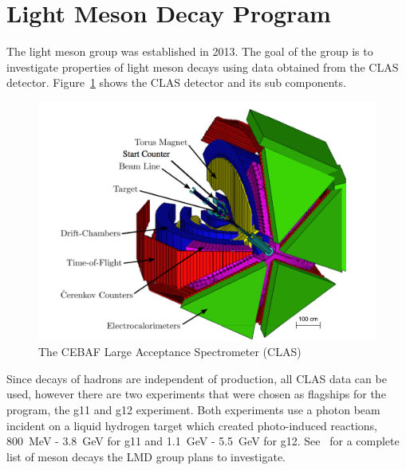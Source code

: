 \documentclass{aip-cp}
\begin{document}
\section{Light Meson Decay Program}
The light meson group was established in 2013. The goal of the group is to investigate properties of light meson decays using data obtained from the CLAS detector. Figure~\ref{fig:clas} shows the CLAS detector and its sub components.
\begin{figure}[h]
	\centerline{\includegraphics[width=175 pt]{figures/clas_schematicIII.pdf}}
	\caption{The CEBAF Large Acceptance Spectrometer (CLAS) }
	\label{fig:clas}
\end{figure}
 Since decays of hadrons are independent of production, all CLAS data can be used, however there are two experiments that were chosen as flagships for the program, the g11 and g12 experiment. Both experiments use a photon beam incident on a liquid hydrogen target which created photo-induced reactions, 800~MeV - 3.8~GeV for g11 and 1.1~GeV - 5.5~GeV for g12.  See~\cite{lmdCAA} for a complete list of meson decays the LMD group plans to investigate.
%
\end{document}
